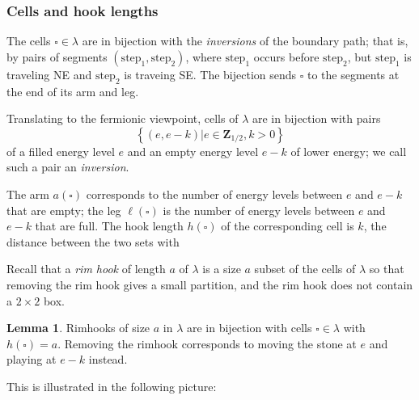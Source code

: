 \documentclass{amsart}[12pt]
\theoremstyle{definition}
\newtheorem{lemma}[dummy]{Lemma}
\newcommand{\Z}{\mathbf{Z}}
\begin{document}
\subsubsection{Cells and hook lengths}

The cells $\square\in\lambda$ are in bijection with the
\emph{inversions} of the boundary path; that is, by pairs of segments
$(\text{step}_1, \text{step}_2)$, where $\text{step}_1$ occurs before $\text{step}_2$,
but $\text{step}_1$ is traveling NE and $\text{step}_2$ is traveing SE.  The bijection
sends $\square$ to the segments at the end of its arm and leg.

Translating to the fermionic viewpoint, cells of $\lambda$ are in
bijection with pairs 
$$\left\{(e, e-k)\big | e\in\Z_{1/2}, k>0\right\}$$ of a filled energy level $e$ and an
empty energy level $e-k$ of lower energy; we call such a pair an \emph{inversion}.  

The arm $a(\square)$ corresponds to the number of energy levels between $e$ and $e-k$ that are empty; the leg $\ell(\square)$ is the number of energy levels between $e$ and $e-k$ that are full.  The hook length $h(\square)$ of the corresponding cell is $k$, the distance between the two sets with 

Recall that a \emph{rim hook} of length $a$ of $\lambda$ is a size $a$ subset of the cells of $\lambda$ so that removing the rim hook gives a small partition, and the rim hook does not contain a $2\times 2$ box.  

\begin{lemma} \label{lem:rimhooks}
Rimhooks of size $a$ in $\lambda$ are in bijection with cells $\square\in\lambda$ with $h(\square)=a$.  Removing the rimhook corresponds to moving the stone at $e$ and playing at $e-k$ instead.
\end{lemma}

This is illustrated in the following picture:
\end{document}
